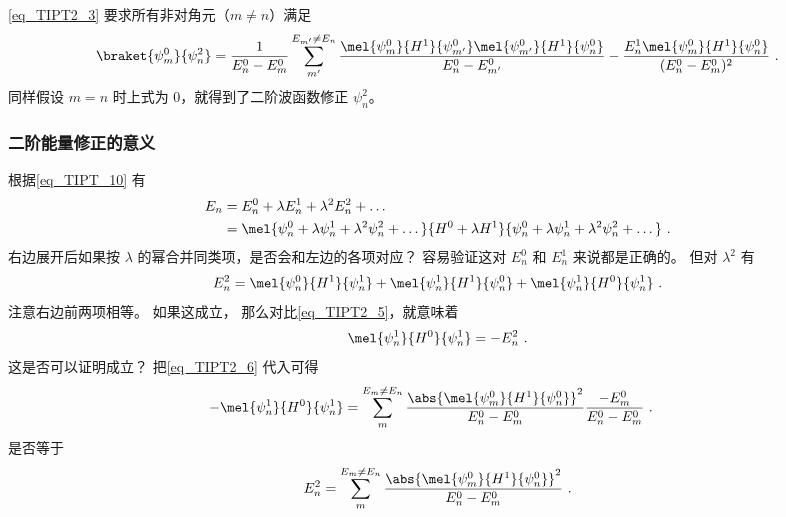 \autoref{eq_TIPT2_3} 要求所有非对角元（$m\ne n$）满足
\begin{equation} %
\braket{\psi_m^0}{\psi_n^2} =
\frac{1}{E_n^0-E_m^0}\sum_{m'}^{E_{m'}\ne E_n}\frac{\mel{\psi_m^0}{H^1}{\psi_{m'}^0}\mel{\psi_{m'}^0}{H^1}{\psi_n^0}}{E_n^0 - E_{m'}^0} - \frac{E_n^1\mel{\psi_m^0}{H^1}{\psi_n^0}}{(E_n^0 - E_m^0)^2}~.
\end{equation}
同样假设 $m=n$ 时上式为 0，就得到了二阶波函数修正 $\psi_n^2$。

\subsubsection{二阶能量修正的意义}
根据\autoref{eq_TIPT_10} 有
\begin{equation}
\begin{aligned}
E_n &= E_n^0 + \lambda E_n^1 + \lambda^2 E_n^2 + \dots \\
&=\mel{\psi_n^0 + \lambda\psi_n^1 + \lambda^2\psi_n^2 + \dots}{H^0 + \lambda H^1}{\psi_n^0 + \lambda\psi_n^1 + \lambda^2 \psi_n^2 + \dots}~.
\end{aligned}
\end{equation}
右边展开后如果按 $\lambda$ 的幂合并同类项，是否会和左边的各项对应？ 容易验证这对 $E_n^0$ 和 $E_n^1$ 来说都是正确的。 但对 $\lambda^2$ 有
\begin{equation}
E_n^2 = \mel{\psi_n^0}{H^1}{\psi_n^1} + \mel{\psi_n^1}{H^1}{\psi_n^0} + \mel{\psi_n^1}{H^0}{\psi_n^1}~.
\end{equation}
注意右边前两项相等。 如果这成立， 那么对比\autoref{eq_TIPT2_5}，就意味着
\begin{equation}
\mel{\psi_n^1}{H^0}{\psi_n^1} = -E_n^2~.
\end{equation}
这是否可以证明成立？ 把\autoref{eq_TIPT2_6} 代入可得
\begin{equation}
\begin{aligned}
-\mel{\psi_n^1}{H^0}{\psi_n^1} &= \sum_{m}^{E_m\ne E_n} \frac{\abs{\mel{\psi_m^0}{H^1}{\psi_n^0}}^2}{E_n^0 - E_m^0} \frac{-E_m^0}{E_n^0 - E_m^0}~.
\end{aligned}
\end{equation}
是否等于
\begin{equation}
E_n^2 = \sum_{m}^{E_m\ne E_n} \frac{\abs{\mel{\psi_m^0}{H^1}{\psi_n^0}}^2}{E_n^0-E_m^0}~.
\end{equation}
